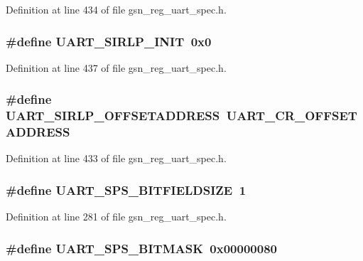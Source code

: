 Definition at line 434 of file gsn\_\-reg\_\-uart\_\-spec.h.

\hypertarget{a00575_a58515313d551fff51ac2f4746edc3355}{
\subsubsection[{UART\_\-SIRLP\_\-INIT}]{\setlength{\rightskip}{0pt plus 5cm}\#define UART\_\-SIRLP\_\-INIT~0x0}}
\label{a00575_a58515313d551fff51ac2f4746edc3355}


Definition at line 437 of file gsn\_\-reg\_\-uart\_\-spec.h.

\hypertarget{a00575_a67249bf8b3013738ca1328a51fc5f47a}{
\subsubsection[{UART\_\-SIRLP\_\-OFFSETADDRESS}]{\setlength{\rightskip}{0pt plus 5cm}\#define UART\_\-SIRLP\_\-OFFSETADDRESS~UART\_\-CR\_\-OFFSETADDRESS}}
\label{a00575_a67249bf8b3013738ca1328a51fc5f47a}


Definition at line 433 of file gsn\_\-reg\_\-uart\_\-spec.h.

\hypertarget{a00575_a03d26824a97e5400b7d132d9671d3f63}{
\subsubsection[{UART\_\-SPS\_\-BITFIELDSIZE}]{\setlength{\rightskip}{0pt plus 5cm}\#define UART\_\-SPS\_\-BITFIELDSIZE~1}}
\label{a00575_a03d26824a97e5400b7d132d9671d3f63}


Definition at line 281 of file gsn\_\-reg\_\-uart\_\-spec.h.

\hypertarget{a00575_a4a17f50bfb0d3892542c422ab25327f4}{
\subsubsection[{UART\_\-SPS\_\-BITMASK}]{\setlength{\rightskip}{0pt plus 5cm}\#define UART\_\-SPS\_\-BITMASK~0x00000080}}
\label{a00575_a4a17f50bfb0d3892542c422ab25327f4}


